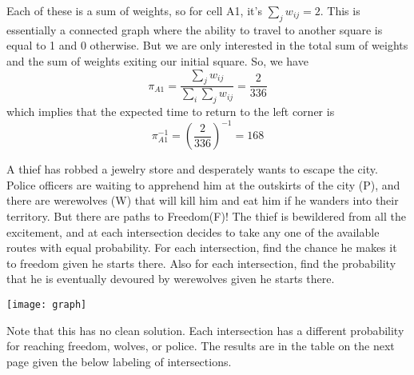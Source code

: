 \documentclass[10pt,a4paper]{exam}
\begin{document}
\begin{questions}
\begin{solution}
Each of these is a sum of weights, so for cell A1, it's $\sum_j w_{ij} = 2$. This is essentially a connected graph where the ability to travel to another square is equal to 1 and 0 otherwise. But we are only interested in the total sum of weights and the sum of weights exiting our initial square. So, we have
$$\pi_{A1} = \frac{\sum_j w_{ij}}{\sum_i \sum_j w_{ij}} = \frac{2}{336}$$
which implies that the expected time to return to the left corner is 
$$\pi_{A1}^{-1} = \left(\frac{2}{336}\right)^{-1} = 168$$
\end{solution}

\pagebreak

\question A thief has robbed a jewelry store and desperately wants to escape the city. Police officers are waiting to apprehend him at the outskirts of the city (P), and there are werewolves (W) that will kill him and eat him if he wanders into their territory. But there are paths to Freedom(F)! The thief is bewildered from all the excitement, and at each intersection decides to take any one of the available routes with equal probability. For each intersection, find the chance he makes it to freedom given he starts there. Also for each intersection, find the probability that he is eventually devoured by werewolves given he starts there.

\texttt{[image: graph]}


\begin{solution}
Note that this has no clean solution. Each intersection has a different probability for reaching freedom, wolves, or police. The results are in the table on the next page given the below labeling of intersections.


\end{solution}
\end{questions}
\end{document}
